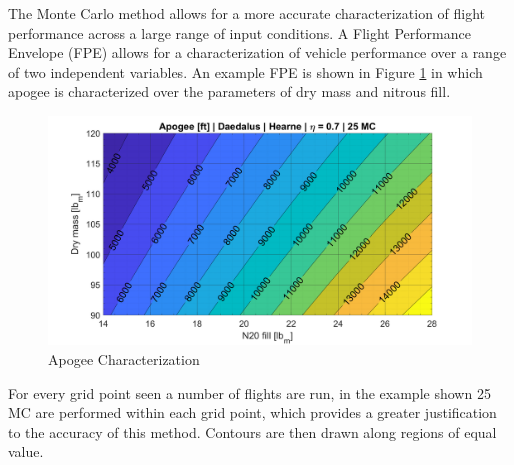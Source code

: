 \documentclass[10pt,a4paper]{article}
\begin{document}
The Monte Carlo method allows for a more accurate characterization of flight performance across a large range of input conditions. A Flight Performance Envelope (FPE) allows for a characterization of vehicle performance over a range of two independent variables. An example FPE is shown in Figure \ref{fig:apogee_eta70} in which apogee is characterized over the parameters of dry mass and nitrous fill. 
\begin{figure}[H]
	\centering
	\includegraphics[width=1\textwidth]{./figs/apogee_eta70.png}
	\caption{Apogee Characterization}
	\label{fig:apogee_eta70}
\end{figure}

For every grid point seen a number of flights are run, in the example shown 25 MC are performed within each grid point, which provides a greater justification to the accuracy of this method. Contours are then drawn along regions of equal value. 
\end{document}
